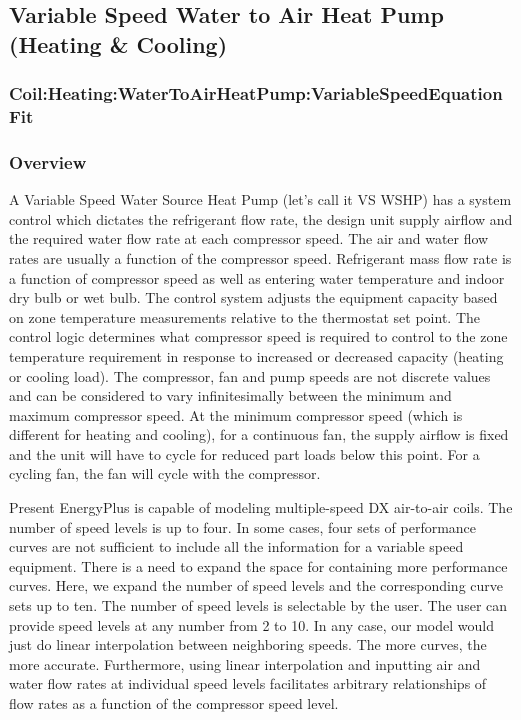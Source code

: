 \subsection{Variable Speed Water to Air Heat Pump (Heating \& Cooling)}\label{variable-speed-water-to-air-heat-pump-heating-cooling}

\subsubsection{Coil:Heating:WaterToAirHeatPump:VariableSpeedEquationFit}\label{coilheatingwatertoairheatpumpvariablespeedequationfit}

\subsubsection{Overview}\label{overview-13}

A Variable Speed Water Source Heat Pump (let's call it VS WSHP) has a system control which dictates the refrigerant flow rate, the design unit supply airflow and the required water flow rate at each compressor speed. The air and water flow rates are usually a function of the compressor speed. Refrigerant mass flow rate is a function of compressor speed as well as entering water temperature and indoor dry bulb or wet bulb. The control system adjusts the equipment capacity based on zone temperature measurements relative to the thermostat set point. The control logic determines what compressor speed is required to control to the zone temperature requirement in response to increased or decreased capacity (heating or cooling load). The compressor, fan and pump speeds are not discrete values and can be considered to vary infinitesimally between the minimum and maximum compressor speed. At the minimum compressor speed (which is different for heating and cooling), for a continuous fan, the supply airflow is fixed and the unit will have to cycle for reduced part loads below this point. For a cycling fan, the fan will cycle with the compressor.

Present EnergyPlus is capable of modeling multiple-speed DX air-to-air coils. The number of speed levels is up to four. In some cases, four sets of performance curves are not sufficient to include all the information for a variable speed equipment. There is a need to expand the space for containing more performance curves. Here, we expand the number of speed levels and the corresponding curve sets up to ten. The number of speed levels is selectable by the user. The user can provide speed levels at any number from 2 to 10. In any case, our model would just do linear interpolation between neighboring speeds. The more curves, the more accurate. Furthermore, using linear interpolation and inputting air and water flow rates at individual speed levels facilitates arbitrary relationships of flow rates as a function of the compressor speed level.

